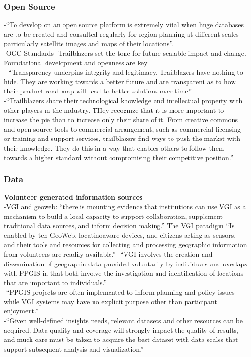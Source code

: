 \subsubsection{Open Source}
-{\color{orange}“To develop on an open source platform is extremely vital when huge databases are to be created and consulted regularly for region planning at different scales particularly satellite images and maps of their locations”.}\cite{Bhattacharya2018}\\
-OGC Standards
-{\color{orange}Trailblazers set the tone for future scalable impact and change. Foundational development and openness are key\cite{WEF2021}}\\
-{\color{orange} “Transparency underpins integrity and legitimacy. Trailblazers have nothing to hide. They are working towards a better future and are transparent as to how their product road map will lead to better solutions over time.”\cite{WEF2021}}\\
-{\color{orange}“Trailblazers share their technological knowledge and intellectual property with other players in the industry. THey recognize that it is more important to increase the pie than to increase only their share of it. From creative commons and open source tools to commercial arrangement, such as commercial licensing or training and support services, trailblazers find ways to push the market with their knowledge. They do this in a way that enables others to follow them towards a higher standard without compromising their competitive position.”\cite{WEF2021}}\\

\subsubsection{Data}
\textbf{Volunteer generated information sources}\\
-{\color{orange}VGI and geoweb: “there is mounting evidence that institutions can use VGI as a mechanism to build a local capacity to support collaboration, supplement traditional data sources, and inform decision making.” The VGI paradigm “Is enabled by teh GeoWeb, locatinoaware devices, and citizens acting as sensors, and their tools and resources for collecting and processing geographic information from volunteers are readily available.”}\cite{Xing2015}
-{\color{orange}“VGI involves the creation and dissemination of geographic data provided voluntarily by individuals and overlaps with PPGIS in that both involve the investigation and identification of locations that are important to individuals.”\cite{Brown2012}}\\
-{\color{orange}“PPGIS projects are often implemented to inform planning and policy issues while VGI systems may have no explicit purpose other than participant enjoyment.”\cite{Brown2012}}\\
-{\color{orange}“Given well-defined insights needs, relevant datasets and other resources can be acquired. Data quality and coverage will strongly impact the quality of results, and much care must be taken to acquire the best dataset with data scales that support subsequent analysis and visualization.”\cite{Borner2019}}\\

